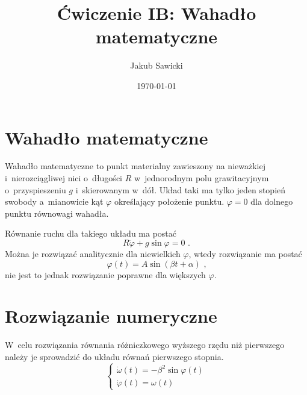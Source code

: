 \documentclass[a4paper; 12pt]{article}
\title{Ćwiczenie IB: Wahadło matematyczne}
\author{Jakub Sawicki}
\date{\today}
\begin{document}
\renewcommand{\figurename}{Rys.}
\renewcommand{\tablename}{Tab.}
\renewcommand{\abstractname}{Abstrakt}

\maketitle

\section{Wahadło matematyczne}

Wahadło matematyczne to punkt materialny zawieszony na nieważkiej
i~nierozciągliwej nici o~długości $R$ w~jednorodnym polu grawitacyjnym
o~przyspieszeniu $g$ i~skierowanym w~dół.
Układ taki ma tylko jeden stopień swobody a~mianowicie kąt $\varphi$
określający położenie punktu.
$\varphi=0$ dla dolnego punktu równowagi wahadła.

Równanie ruchu dla takiego układu ma postać
\begin{equation}
    R\ddot{\varphi}+g\sin{\varphi} = 0 \text{ .}
    \label{eq:eqofmotion}
\end{equation}
Można je rozwiązać analitycznie dla niewielkich $\varphi$, wtedy rozwiązanie ma postać
\begin{equation}
    \varphi(t) = A \sin(\beta t + \alpha) \text{ ,}
    \label{eq:analyticsolution}
\end{equation}
nie jest to jednak rozwiązanie poprawne dla większych $\varphi$.


\section{Rozwiązanie numeryczne}

W~celu rozwiązania równania różniczkowego wyższego rzędu niż pierwszego należy
je sprowadzić do układu równań pierwszego stopnia.
\begin{equation}
    \begin{cases}
        \dot{\omega}(t) = - \beta^2\sin{\varphi(t)} \\
        \dot{\varphi}(t) = \omega(t)
    \end{cases}
    \label{eq:1storderODE}
\end{equation}
\end{document}
